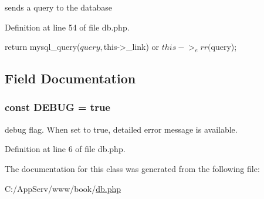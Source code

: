 sends a query to the database 



Definition at line 54 of file db.php.




\begin{DoxyCode}
                               {
    return mysql_query($query, $this->_link) or $this->_err($query);
  }
\end{DoxyCode}




\subsection{Field Documentation}
\hypertarget{class_database_a758c150b67e476ecf77478f16b387c61}{
\subsubsection[{DEBUG}]{\setlength{\rightskip}{0pt plus 5cm}const {\bf DEBUG} = true}}
\label{class_database_a758c150b67e476ecf77478f16b387c61}
debug flag. When set to true, detailed error message is available. 

Definition at line 6 of file db.php.



The documentation for this class was generated from the following file:\begin{DoxyCompactItemize}
\item 
C:/AppServ/www/book/\hyperlink{db_8php}{db.php}\end{DoxyCompactItemize}
